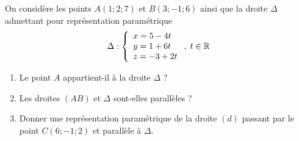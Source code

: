 \documentclass[11pt,fleqn, openany]{book} %
\begin{document}
\begin{exercise}On considère les points $A(1;2;7)$ et $B(3;-1;6)$ ainsi que la droite $\Delta$ admettant pour représentation paramétrique \[ \Delta : \left\{\renewcommand{\arraystretch}{1}\begin{array}{l} x = 5 -4t \\ y = 1+6t \\ z = -3+2t 

\end{array}\right. ,\; t\in \mathbb{R}\] 

\begin{enumerate}
\item Le point $A$ appartient-il à la droite $\Delta$ ?
\item Les droites $(AB)$ et $\Delta$ sont-elles parallèles ?
\item Donner une représentation paramétrique de la droite $(d)$ passant par le point $C(6;-1;2)$ et parallèle à $\Delta$.
\end{enumerate}
\end{exercise}
\end{document}

